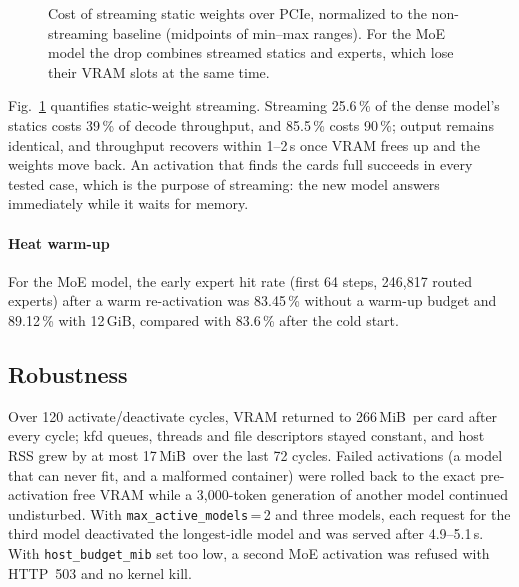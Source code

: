 \documentclass[10pt,conference,a4paper]{IEEEtran}
\newcommand{\code}[1]{\texttt{#1}}
\newcommand{\GiB}{\,GiB}
\newcommand{\MiB}{\,MiB}
\begin{document}
\begin{figure}[t]
\centering
{}
\caption{Cost of streaming static weights over PCIe, normalized to the non-streaming baseline
(midpoints of min--max ranges). For the MoE model the drop combines streamed statics and experts,
which lose their VRAM slots at the same time.}
\label{fig:streaming}
\end{figure}

Fig.~\ref{fig:streaming} quantifies static-weight streaming. Streaming 25.6\,\% of the dense model's
statics costs 39\,\% of decode throughput, and 85.5\,\% costs 90\,\%; output remains identical, and
throughput recovers within 1--2\,s once VRAM frees up and the weights move back. An activation that
finds the cards full succeeds in every tested case, which is the purpose of streaming: the new model
answers immediately while it waits for memory.

\paragraph{Heat warm-up} For the MoE model, the early expert hit rate (first 64 steps, 246{,}817
routed experts) after a warm re-activation was 83.45\,\% without a warm-up budget and 89.12\,\% with
12\GiB, compared with 83.6\,\% after the cold start.

\subsection{Robustness}

Over 120 activate/deactivate cycles, VRAM returned to 266\MiB\ per card after every cycle; kfd queues,
threads and file descriptors stayed constant, and host RSS grew by at most 17\MiB\ over the last 72
cycles. Failed activations (a model that can never fit, and a malformed container) were rolled back to
the exact pre-activation free VRAM while a 3{,}000-token generation of another model continued
undisturbed. With \code{max\_active\_models}\,=\,2 and three models, each request for the third model
deactivated the longest-idle model and was served after 4.9--5.1\,s. With \code{host\_budget\_mib}
set too low, a second MoE activation was refused with HTTP~503 and no kernel kill.
\end{document}
